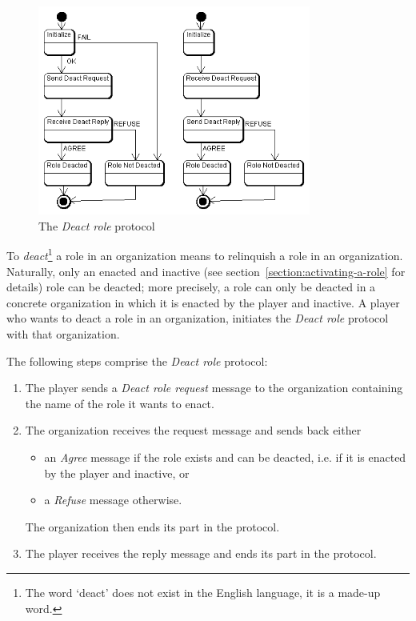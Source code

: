 \begin{figure}[ht]
	\centering
	\includegraphics[width=0.8\textwidth]{images/thespian/deact-role-protocol.png}
	\caption{The \textit{Deact role} protocol}
	\label{figure:thespian-deact-role-protocol}
\end{figure}

To \textit{deact}\footnote{The word `deact' does not exist in the English language, it is a made-up word.} a role in an organization means to relinquish a role in an organization.
Naturally, only an enacted and inactive (see section~\ref{section:activating-a-role} for details) role can be deacted; more precisely, a role can only be deacted in a concrete organization in which it is enacted by the player and inactive.
A player who wants to deact a role in an organization, initiates the \textit{Deact role} protocol with that organization.

The following steps comprise the \textit{Deact role} protocol:
\begin{enumerate}
	\item The player sends a \textit{Deact role request} message to the organization containing the name of the role it wants to enact.
	\item The organization receives the request message and sends back either
	\begin{itemize}
		\item an \textit{Agree} message if the role exists and can be deacted, i.e. if it is enacted by the player and inactive, or
		\item a \textit{Refuse} message otherwise. 
	\end{itemize}
	The organization then ends its part in the protocol.
	\item The player receives the reply message and ends its part in the protocol.
\end{enumerate}

